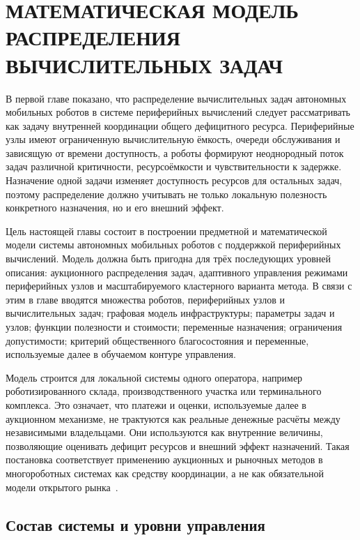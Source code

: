 \chapter{МАТЕМАТИЧЕСКАЯ МОДЕЛЬ РАСПРЕДЕЛЕНИЯ ВЫЧИСЛИТЕЛЬНЫХ ЗАДАЧ}\label{ch:ch2}

В первой главе показано, что распределение вычислительных задач автономных мобильных роботов в системе периферийных вычислений следует рассматривать как задачу внутренней координации общего дефицитного ресурса. Периферийные узлы имеют ограниченную вычислительную ёмкость, очереди обслуживания и зависящую от времени доступность, а роботы формируют неоднородный поток задач различной критичности, ресурсоёмкости и чувствительности к задержке. Назначение одной задачи изменяет доступность ресурсов для остальных задач, поэтому распределение должно учитывать не только локальную полезность конкретного назначения, но и его внешний эффект.

Цель настоящей главы состоит в построении предметной и математической модели системы автономных мобильных роботов с поддержкой периферийных вычислений. Модель должна быть пригодна для трёх последующих уровней описания: аукционного распределения задач, адаптивного управления режимами периферийных узлов и масштабируемого кластерного варианта метода. В связи с этим в главе вводятся множества роботов, периферийных узлов и вычислительных задач; графовая модель инфраструктуры; параметры задач и узлов; функции полезности и стоимости; переменные назначения; ограничения допустимости; критерий общественного благосостояния и переменные, используемые далее в обучаемом контуре управления.

Модель строится для локальной системы одного оператора, например роботизированного склада, производственного участка или терминального комплекса. Это означает, что платежи и оценки, используемые далее в аукционном механизме, не трактуются как реальные денежные расчёты между независимыми владельцами. Они используются как внутренние величины, позволяющие оценивать дефицит ресурсов и внешний эффект назначений. Такая постановка соответствует применению аукционных и рыночных методов в многороботных системах как средству координации, а не как обязательной модели открытого рынка~\cite{Gerkey2004FormalMRTA,Dias2006MarketBasedMR}.

\section{Состав системы и уровни управления}

